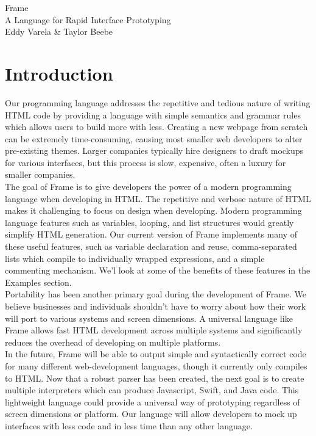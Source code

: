\documentclass{article}
\begin{document}
\setlength\parindent{0pt}

\begin{center}
{\huge Frame}\\
\vspace{5px}
{\large A Language for Rapid Interface Prototyping }\\
\vspace{5px}
{\large Eddy Varela \& Taylor Beebe}
\end{center}

\section{Introduction}

Our programming language addresses the repetitive and tedious nature of writing HTML code by providing a language with simple semantics and grammar rules which allows users to build more with less.  Creating a new webpage from scratch can be extremely time-consuming, causing most smaller web developers to alter pre-existing themes. Larger companies typically hire designers to draft mockups for various interfaces, but this process is slow, expensive, often a luxury for smaller companies.\\

The goal of Frame is to give developers the power of a modern programming language when developing in HTML. The repetitive and verbose nature of HTML makes it challenging to focus on design when developing. Modern programming language features such as variables, looping, and list structures would greatly simplify HTML generation. Our current version of Frame implements many of these useful features, such as variable declaration and reuse, comma-separated lists which compile to individually wrapped expressions, and a simple commenting mechanism. We'l look at some of the benefits of these features in the Examples section.\\

Portability has been another primary goal during the development of Frame. We believe businesses and individuals shouldn't have to worry about how their work will port to various systems and screen dimensions. A universal language like Frame allows fast HTML development across multiple systems and significantly reduces the overhead of developing on multiple platforms.\\

In the future, Frame will be able to output simple and syntactically correct code for many different web-development languages, though it currently only compiles to HTML. Now that a robust parser has been created, the next goal is to create multiple interpreters which can produce Javascript, Swift, and Java code. This lightweight language could provide a universal way of prototyping regardless of screen dimensions or platform. Our language will allow developers to mock up interfaces with less code and in less time than any other language.\\
\end{document}
